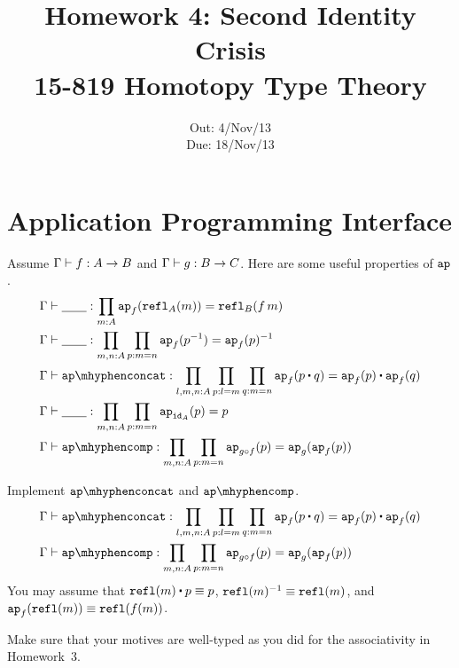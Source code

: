 \documentclass[12pt]{article}
\title{\Large\textbf{
  Homework 4: Second Identity Crisis}
\normalsize\\
15-819 Homotopy Type Theory}
\author{}
\date{%
Out: 4/Nov/13\\
Due: 18/Nov/13
}
\begin{document}
\maketitle

\section{Application Programming Interface}

Assume
$\Gamma \vdash f : A \to B$ and
$\Gamma \vdash g : B \to C$.
Here are some useful properties of $\mathtt{ap}$.
\begin{align*}
  &\ctx \entails \blank : \prod_{m:A}\ap_f(\refl_A(m)) = \refl_B(f\,m)
  \\
  &\ctx \entails \blank : \prod_{m,n:A}\prod_{p:m=n}\ap_f(p^{-1}) = \ap_f(p)^{-1}
  \\
  &\ctx \entails \apconcat : \prod_{l,m,n:A}\prod_{p:l=m}\prod_{q:m=n}\ap_f(p \concat q) = \ap_f(p) \concat \ap_f(q)
  \\
  &\ctx \entails \blank : \prod_{m,n:A}\prod_{p:m=n}\ap_{\id_A}(p) = p
  \\
  &\ctx \entails \apcomp : \prod_{m,n:A}\prod_{p:m=n}\ap_{g \comp f}(p) = \ap_g(\ap_f(p))
\end{align*}

\pagebreak[2]

\begin{task}
  Implement $\apconcat$ and $\apcomp$.
  \begin{align*}
    &\ctx \entails \apconcat : \prod_{l,m,n:A}\prod_{p:l=m}\prod_{q:m=n}\ap_f(p \concat q) = \ap_f(p) \concat \ap_f(q)
    \\
    &\ctx \entails \apcomp : \prod_{m,n:A}\prod_{p:m=n}\ap_{g \comp f}(p) = \ap_g(\ap_f(p))
  \end{align*}
  You may assume that $\refl(m) \concat p \jdeq p$, $\mathtt{refl}(m)^{-1} \equiv \mathtt{refl}(m)$,
  and $\mathtt{ap}_f(\mathtt{refl}(m)) \equiv \mathtt{refl}(f(m))$.
  \begin{hint}
    Make sure that your motives are well-typed
    as you did for the associativity in Homework~3.
  \end{hint}
\end{task}
\end{document}
